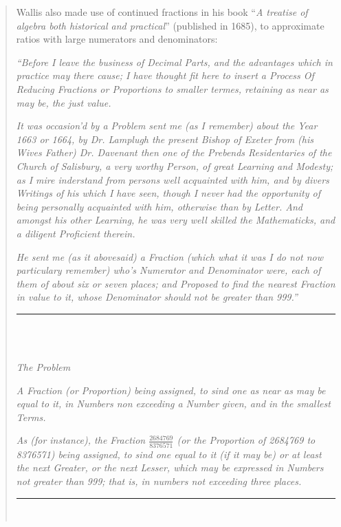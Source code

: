 \begin{quote}
Wallis  also made use of continued fractions in his book
``\emph{A treatise of algebra both historical and practical}''
(published in 1685), to approximate ratios with large
numerators and denominators:

\emph{``Before I leave the business of Decimal Parts, and the 
advantages which in practice may there cause; I have thought fit 
here to insert a Process Of Reducing Fractions or Proportions to
smaller termes, retaining as near as may be, the just value.}

\emph{It was occasion'd by a Problem sent me (as I remember) about the
Year 1663 or 1664, by Dr. Lamplugh the present Bishop of Exeter from
(his Wives Father) Dr. Davenant then one of the Prebends
Residentaries of the Church of Salisbury, a very worthy Person, of
great Learning and Modesty; as I mire inderstand from persons
well acquainted with him, and by divers Writings of his which I have seen,
though I never had the opportunity of being personally acquainted with him,
otherwise than by Letter.  And amongst
his other Learning, he was very well skilled the Mathematicks,
and a diligent Proficient therein.}

\emph{He sent me (as it abovesaid) a Fraction (which what it was I 
do not now particulary remember) who's Numerator and Denominator
were, each of them of about six or seven places; and Proposed to
find the nearest Fraction in value to it, whose Denominator should
not be greater than 999.''}

\begin{center}
\rule{3in}{0.3mm}  \\\
\end{center}

\begin{center}
\emph{The Problem} \\
\end{center}

\emph{A Fraction (or Proportion) being assigned, to sind one as near as 
may be equal to it, in Numbers non exceeding a Number given, and in
the smallest Terms.}

\emph{As (for instance), the Fraction $\frac{2684769}{8376571}$ (or the
Proportion of 2684769 to 8376571) being assigned, to sind one equal to it
(if it may be) or at least the next Greater, or the next Lesser,
which may be expressed in Numbers not greater than 999; that is, in numbers
not exceeding three places.}

\begin{center}
\rule{3in}{0.3mm}  \\
\end{center}


\end{quote}
